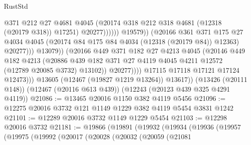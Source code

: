 \begin{lexlean}{RustStd}
\begin{coremodule}
                                            @371
                                            @212
                                            @27
                                            @4681
                                            @4045
                                            (@20174
                                              @318
                                              @212
                                              @318
                                              @4681
                                              (@12318 (@20179 @318))
                                              @17251)
                                            @20277))))))
                                @19579))
                            (@20166
                              @361
                              @371
                              @175
                              @27
                              @4034
                              @4045
                              (@20174 @84 @175 @84 @4034 (@12318 (@20179 @84)) @12363)
                              @20277)))
                        @13079))
                    (@20166
                      @449
                      @371
                      @182
                      @27
                      @4213
                      @4045
                      (@20146
                        @449
                        @182
                        @4213
                        (@20886
                          @439
                          @182
                          @371
                          @27
                          @4119
                          @4045
                          @4211
                          @12572
                          (@12789 @20085 @3732)
                          @13102))
                      @20277))))
              @17115
              @17118
              @17121
              @17124
              @12473)))
        @13605
        (@12467 (@19827 @1219 @13264))
        @13617))
    (@13426 (@20111 @148))
    (@12467 (@20116 @613 @439))
    (@12243 (@20123 @439 @325 @4291 @4119))
@21086 := @13465 @20016 @1150 @382 @4119 @5456
@21096 := @12275 @20016 @3732 @121 @1149 @1229 @382 @4119 @5454 @3831 @1242
@21101 := @12289 @20016 @3732 @1149 @1229 @5454
@21103 := @12298 @20016 @3732
@21181 := @19866
    (@19891
      (@19932
        (@19934
          (@19936
            (@19957
              (@19975
                (@19992
                  (@20017
                    (@20028
                      (@20032
                        (@20059
                          (@21081

\end{coremodule}
\end{lexlean}

